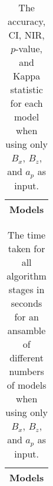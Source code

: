 \begin{table}[!ht]
	\centering
	\begin{tabular}{|c|}
		\hline
		Models \\ \hline
	\end{tabular}
	\caption{The accuracy, CI, NIR, $p$-value, and Kappa statistic for each model when using only $B_{x}$, $B_{z}$, and $a_{p}$ as input.}
	\label{tab:time:ansamble:xzap}
\end{table}

\begin{table}[!ht]
	\centering
	\begin{tabular}{|c|}
		\hline
		Models \\ \hline
	\end{tabular}
	\caption{The time taken for all algorithm stages in seconds for an ansamble of different numbers of models when using only $B_{x}$, $B_{z}$, and $a_{p}$ as input.}
	\label{tab:time:ansamble:reverse:xzap}
\end{table}
